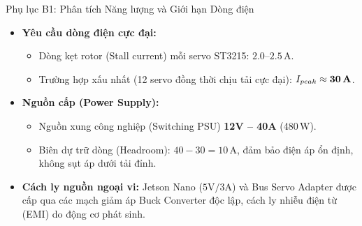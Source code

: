 \documentclass[10pt,aspectratio=169]{beamer}
\begin{document}
\begin{frame}{Phụ lục B1: Phân tích Năng lượng và Giới hạn Dòng điện}
  \begin{itemize}
      \item \textbf{Yêu cầu dòng điện cực đại:} 
      \begin{itemize}
          \item Dòng kẹt rotor (Stall current) mỗi servo ST3215: $2.0\text{--}2.5\,$A.
          \item Trường hợp xấu nhất (12 servo đồng thời chịu tải cực đại): $I_{peak} \approx \textbf{30\,A}$.
      \end{itemize}
      \item \textbf{Nguồn cấp (Power Supply):}
      \begin{itemize}
          \item Nguồn xung công nghiệp (Switching PSU) \textbf{12V -- 40A} (480\,W).
          \item Biên dự trữ dòng (Headroom): $40 - 30 = 10\,$A, đảm bảo điện áp ổn định, không sụt áp dưới tải đỉnh.
      \end{itemize}
      \item \textbf{Cách ly nguồn ngoại vi:} Jetson Nano ($5\text{V}/3\text{A}$) và Bus Servo Adapter được cấp qua các mạch giảm áp Buck Converter độc lập, cách ly nhiễu điện từ (EMI) do động cơ phát sinh.
  \end{itemize}
\end{frame}
\end{document}
